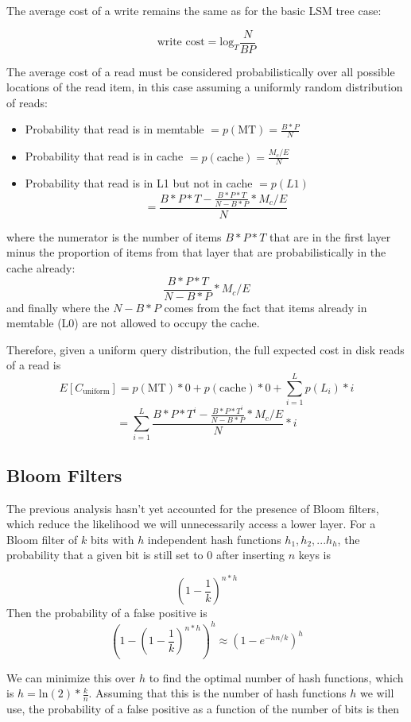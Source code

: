 \documentclass{sig-alternate-05-2015}
\begin{document}
The average cost of a write remains the same as for the basic LSM tree case:

$$
\text{write cost} = \textrm{log}_{T} \frac{N}{BP}
$$

The average cost of a read must be considered probabilistically over all
possible locations of the read item, in this case assuming a uniformly random
distribution of reads:

\begin{itemize}
\item Probability that read is in memtable $= p(\text{MT}) = \frac{B*P}{N}$
\item Probability that read is in cache $= p(\text{cache}) = \frac{M_c/E}{N}$
\item Probability that read is in L1 but not in cache $= p(L1)$ $$= \frac{B*P * T - \frac{B*P*T}{N-B*P} * M_c/E}{N}$$
\end{itemize}

where the numerator is the number of items $B*P*T$ that are in the first layer
minus the proportion of items from that layer that are probabilistically in the
cache already: $$\frac{B*P*T}{N-B*P} * M_c/E$$ and finally where the $N-B*P$
comes from the fact that items already in memtable (L0) are not allowed to
occupy the cache.

Therefore, given a uniform query distribution, the full expected cost in disk
reads of a read is
$$E[C_{\text{uniform}}] = p(\text{MT}) * 0  + p(\text{cache}) * 0 + \sum_{i=1}^L p(L_i) * i$$
$$=\sum_{i=1}^L \frac{B*P * T^i - \frac{B*P*T^i}{N-B*P} * M_c/E}{N} * i$$


\subsection{Bloom Filters}

The previous analysis hasn't yet accounted for the presence of Bloom filters,
which reduce the likelihood we will unnecessarily access a lower layer. For a
Bloom filter of $k$ bits with $h$ independent hash functions $h_1, h_2,...h_h$,
the probability that a given bit is still set to 0 after inserting $n$ keys is 

$$
(1 - \frac{1}{k})^{n*h}
$$
Then the probability of a false positive is 
$$
(1- (1 - \frac{1}{k})^{n*h})^h \approx (1 - e^{-hn/k})^h
$$

We can minimize this over $h$ to find the optimal number of hash functions,
which is $h = \mathrm{ln}(2) * \frac{k}{n}$. Assuming that this is the number
of hash functions $h$ we will use, the probability of a false positive as a
function of the number of bits is then 
\end{document}

